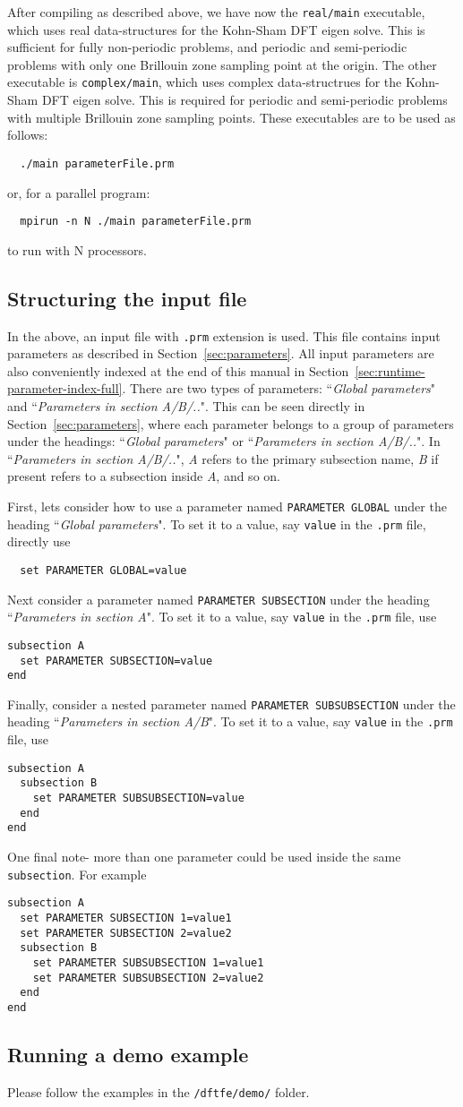 After compiling \dftfe{} as described above, we have now the \verb|real/main| executable, which uses real data-structures for the Kohn-Sham DFT eigen solve. This is sufficient for fully non-periodic problems, and periodic and semi-periodic problems with only one Brillouin zone sampling point at the origin. The other executable is \verb|complex/main|, which uses complex data-structrues for the Kohn-Sham DFT eigen solve. This is required for periodic and semi-periodic problems with multiple Brillouin zone sampling points. These executables are to be used as follows:
\begin{verbatim}
  ./main parameterFile.prm
\end{verbatim}
or, for a parallel program:
\begin{verbatim}
  mpirun -n N ./main parameterFile.prm
\end{verbatim}
to run with N processors. 
\subsection{Structuring the input file}
In the above, an input file with \verb|.prm| extension is used. This file contains input parameters as described in Section~\ref{sec:parameters}. All input parameters are also conveniently indexed at the end of this manual in Section~\ref{sec:runtime-parameter-index-full}. There are two types of parameters: ``{\it Global parameters}" and ``{\it Parameters in section A/B/..}". This can be seen directly in Section~\ref{sec:parameters}, where each parameter belongs to a group of parameters under the headings: ``{\it Global parameters}" or ``{\it Parameters in section A/B/..}". In ``{\it Parameters in section A/B/..}", {\it A} refers to the primary subsection name, {\it B} if present refers to a subsection inside {\it A}, and so on. 

First, lets consider how to use a parameter named \verb|PARAMETER GLOBAL| under the heading ``{\it Global parameters}". To set it to a value, say \verb|value|  in the  \verb|.prm| file, directly use
\begin{verbatim}
  set PARAMETER GLOBAL=value
\end{verbatim}
Next consider a parameter named \verb|PARAMETER SUBSECTION| under the heading ``{\it Parameters in section A}". To set it to a value, say \verb|value|  in the  \verb|.prm| file, use 
\begin{verbatim}
subsection A
  set PARAMETER SUBSECTION=value
end
\end{verbatim}
Finally, consider a nested parameter named  \verb|PARAMETER SUBSUBSECTION| under the heading ``{\it Parameters in section A/B}". To set it to a value, say \verb|value|  in the  \verb|.prm| file, use 
\begin{verbatim}
subsection A
  subsection B
    set PARAMETER SUBSUBSECTION=value
  end
end
\end{verbatim}
One final note- more than one parameter could be used inside the same \verb|subsection|. For example
\begin{verbatim}
subsection A
  set PARAMETER SUBSECTION 1=value1
  set PARAMETER SUBSECTION 2=value2
  subsection B
    set PARAMETER SUBSUBSECTION 1=value1
    set PARAMETER SUBSUBSECTION 2=value2
  end
end
\end{verbatim}
\subsection{Running a demo example}
Please follow the examples in the \verb|/dftfe/demo/| folder.
